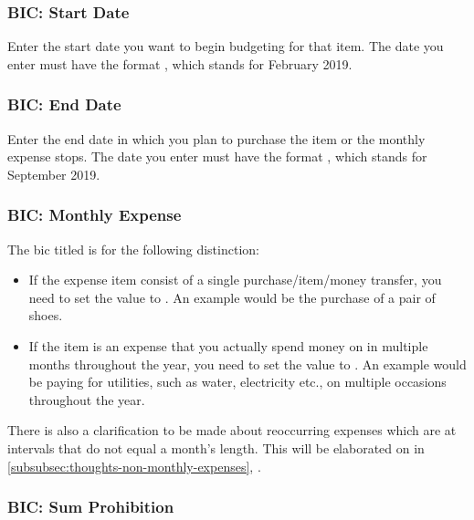 \subsubsection{BIC: Start Date}
\label{subsubsec:budgeting-item-column-start-date}

Enter the start date you want to begin budgeting for that item.
The date you enter must have the format , \eg {} which stands for February 2019.

\subsubsection{BIC: End Date}
\label{subsubsec:budgeting-item-column-end-date}

Enter the end date in which you plan to purchase the item or the monthly expense stops.
The date you enter must have the format , \eg {} which stands for September 2019.

\subsubsection{BIC: Monthly Expense}
\label{subsubsec:budgeting-item-column-monthly-expense}

The \ac{bic} titled  is for the following distinction:
\begin{itemize}
	\item If the expense item consist of a single purchase/item/money transfer, you need to set the value to .
	An example would be the purchase of a pair of shoes.
	\item If the item is an expense that you actually spend money on in multiple months throughout the year, you need to set the value to .
	An example would be paying for \eg utilities, such as water, electricity etc., on multiple occasions throughout the year.
\end{itemize}

There is also a clarification to be made about reoccurring expenses which are at intervals that do not equal a month's length.
This will be elaborated on in \autoref{subsubsec:thoughts-non-monthly-expenses}, .

\subsubsection{BIC: Sum Prohibition}
\label{subsubsec:budgeting-item-column-sum-prohibition}

